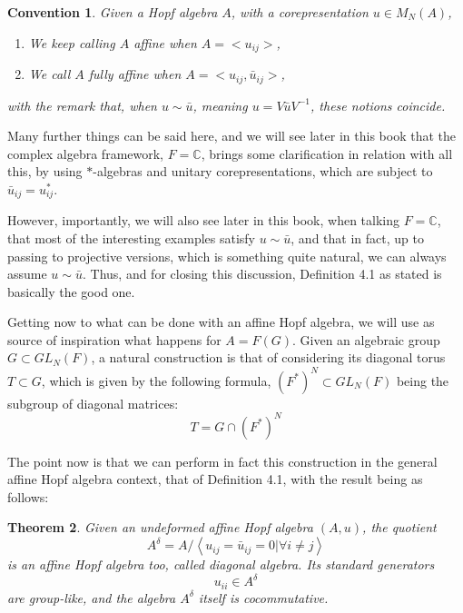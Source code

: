 \documentclass[12pt]{amsbook}
\newtheorem{theorem}{Theorem}[chapter]
\newtheorem{convention}[theorem]{Convention}
\begin{document}

\begin{convention}
Given a Hopf algebra $A$, with a corepresentation $u\in M_N(A)$,
\begin{enumerate}
\item We keep calling $A$ affine when $A=<u_{ij}>$,

\item We call $A$ fully affine when $A=<u_{ij},\bar{u}_{ij}>$,
\end{enumerate}
with the remark that, when $u\sim\bar{u}$, meaning $u=V\bar{u}V^{-1}$, these notions coincide.
\end{convention}

Many further things can be said here, and we will see later in this book that the complex algebra framework, $F=\mathbb C$, brings some clarification in relation with all this, by using $*$-algebras and unitary corepresentations, which are subject to $\bar{u}_{ij}=u_{ij}^*$.

\bigskip

However, importantly, we will also see later in this book, when talking $F=\mathbb C$, that most of the interesting examples satisfy $u\sim\bar{u}$, and that in fact, up to passing to projective versions, which is something quite natural, we can always assume $u\sim\bar{u}$. Thus, and for closing this discussion, Definition 4.1 as stated is basically the good one. 

\bigskip

Getting now to what can be done with an affine Hopf algebra, we will use as source of inspiration what happens for $A=F(G)$. Given an algebraic group $G\subset GL_N(F)$, a natural construction is that of considering its diagonal torus $T\subset G$, which is given by the following formula, $(F^*)^N\subset GL_N(F)$ being the subgroup of diagonal matrices:
$$T=G\cap(F^*)^N$$

The point now is that we can perform in fact this construction in the general affine Hopf algebra context, that of Definition 4.1, with the result being as follows:


\begin{theorem}
Given an undeformed affine Hopf algebra $(A,u)$, the quotient
$$A^\delta=A\Big/\left<u_{ij}=\bar{u}_{ij}=0\Big|\forall i\neq j\right>$$
is an affine Hopf algebra too, called diagonal algebra. Its standard generators 
$$u_{ii}\in A^\delta$$
are group-like, and the algebra $A^\delta$ itself is cocommutative.
\end{theorem}
\end{document}
